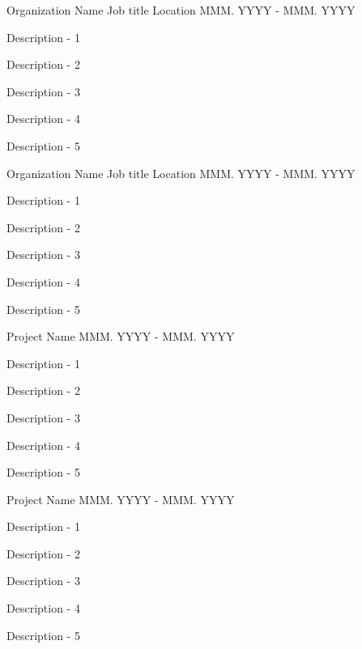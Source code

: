\documentclass[11pt, a4paper]{resume-lab}
\begin{document}
\begin{Parallel}[v]{0.265\textwidth}{0.66\textwidth}
{\begin{cvletter}
				\cventry
				{Organization Name} %
				{Job title} %
				{Location} %
				{MMM. YYYY - MMM. YYYY} %
				{
					\begin{cvitems} %
						\item {Description - 1}
						\item {Description - 2}
						\item {Description - 3}
						\item {Description - 4}
						\item {Description - 5}
					\end{cvitems}
				}
				
				\cventry
				{Organization Name} %
				{Job title} %
				{Location} %
				{MMM. YYYY - MMM. YYYY} %
				{
					\begin{cvitems} %
						\item {Description - 1}
						\item {Description - 2}
						\item {Description - 3}
						\item {Description - 4}
						\item {Description - 5}
					\end{cvitems}
				}
				\cvhonor
				{Project Name} %
				{MMM. YYYY - MMM. YYYY} %
				{
					\begin{cvhonoritems} %
						\item {Description - 1}
						\item {Description - 2}
						\item {Description - 3}
						\item {Description - 4}
						\item {Description - 5}
					\end{cvhonoritems}
				}
				
				\cvhonor
				{Project Name} %
				{MMM. YYYY - MMM. YYYY} %
				{
					\begin{cvhonoritems} %
						\item {Description - 1}
						\item {Description - 2}
						\item {Description - 3}
						\item {Description - 4}
						\item {Description - 5}
					\end{cvhonoritems}
				}
				

\end{cvletter}}
\end{Parallel}
\end{document}
